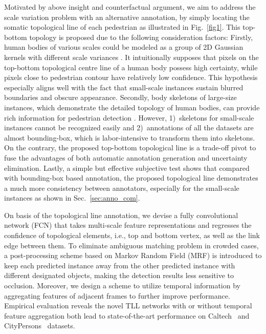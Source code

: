 \documentclass[runningheads]{llncs}
\begin{document}
Motivated by above insight and counterfactual argument, we aim to address the scale variation problem with an alternative annotation, by simply locating the somatic topological line of each pedestrian as illustrated in Fig.~\ref{fig1}. This top-bottom topology is proposed due to the following consideration factors: Firstly, human bodies of various scales could be modeled as a group of 2D Gaussian kernels with different scale variances \cite{CC,SICC}. It intuitionally supposes that pixels on the top-bottom topological centre line of a human body possess high certainty, while pixels close to pedestrian contour have relatively low confidence. This hypothesis especially aligns well with the fact that small-scale instances sustain blurred boundaries and obscure appearance. Secondly, body skeletons of large-size instances, which demonstrate the detailed topology of human bodies, can provide rich information for pedestrian detection \cite{CMUPose,GooglePose,HIKPose}. However, 1)~skeletons for small-scale instances cannot be recognized easily and 2)~annotations of all the datasets are almost bounding-box, which is labor-intensive to transform them into skeletons. On the contrary, the proposed top-bottom topological line is a trade-off pivot to fuse the advantages of both automatic annotation generation and uncertainty elimination. Lastly, a simple but effective subjective test shows that compared with bounding-box based annotation, the proposed topological line demonstrates a much more consistency between annotators, especially for the small-scale instances as shown in Sec.~\ref{sec:anno_com}.

On basis of the topological line annotation, we devise a fully convolutional network (FCN) that takes multi-scale feature representations and regresses the confidence of topological elements, i.e., top and bottom vertex, as well as the link edge between them. To eliminate ambiguous matching problem in crowded cases, a post-processing scheme based on Markov Random Field (MRF) is introduced to keep each predicted instance away from the other predicted instance with different designated objects, making the detection results less sensitive to occlusion. Moreover, we design a scheme to utilize temporal information by aggregating features of adjacent frames to further improve performance. Empirical evaluation reveals the novel TLL networks with or without temporal feature aggregation both lead to state-of-the-art performance on Caltech~\cite{Caltech} and CityPersons~\cite{CityPersons} datasets.
\end{document}
